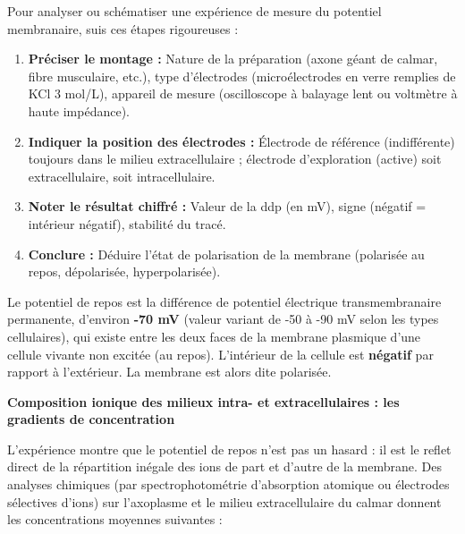\documentclass[11pt]{article}
\newcommand{\cle}[1]{{\popxbold\color{popdark}#1}}
\begin{document}
\begin{methode}
Pour analyser ou schématiser une expérience de mesure du potentiel membranaire, suis ces étapes rigoureuses :
\begin{enumerate}
    \item \textbf{Préciser le montage :} Nature de la préparation (axone géant de calmar, fibre musculaire, etc.), type d'électrodes (microélectrodes en verre remplies de KCl 3 mol/L), appareil de mesure (oscilloscope à balayage lent ou voltmètre à haute impédance).
    \item \textbf{Indiquer la position des électrodes :} Électrode de référence (indifférente) toujours dans le milieu extracellulaire ; électrode d'exploration (active) soit extracellulaire, soit intracellulaire.
    \item \textbf{Noter le résultat chiffré :} Valeur de la ddp (en mV), signe (négatif = intérieur négatif), stabilité du tracé.
    \item \textbf{Conclure :} Déduire l'état de polarisation de la membrane (polarisée au repos, dépolarisée, hyperpolarisée).
\end{enumerate}
\end{methode}

\begin{definition}
Le \cle{potentiel de repos} est la différence de potentiel électrique transmembranaire permanente, d'environ \textbf{-70 mV} (valeur variant de -50 à -90 mV selon les types cellulaires), qui existe entre les deux faces de la membrane plasmique d'une cellule vivante non excitée (au repos). L'intérieur de la cellule est \textbf{négatif} par rapport à l'extérieur. La membrane est alors dite \cle{polarisée}.
\end{definition}

\textbf{Composition ionique des milieux intra- et extracellulaires : les gradients de concentration}\par

L'expérience montre que le potentiel de repos n'est pas un hasard : il est le reflet direct de la répartition inégale des ions de part et d'autre de la membrane. Des analyses chimiques (par spectrophotométrie d'absorption atomique ou électrodes sélectives d'ions) sur l'axoplasme et le milieu extracellulaire du calmar donnent les concentrations moyennes suivantes :
\end{document}
